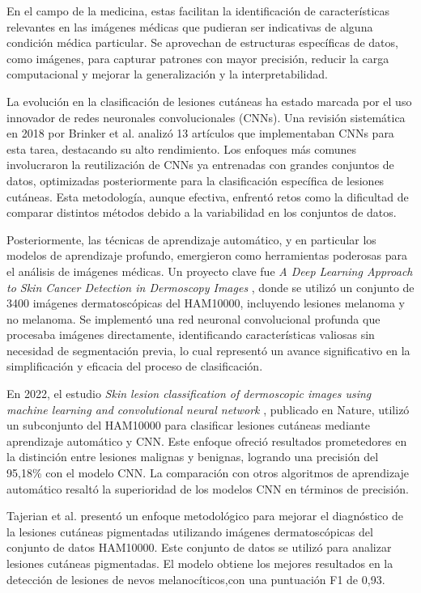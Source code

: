 En el campo de la medicina, estas facilitan la identificación de características relevantes en las imágenes médicas que pudieran ser indicativas de alguna condición médica particular. Se aprovechan de estructuras específicas de datos, como imágenes, para capturar patrones con mayor precisión, reducir la carga computacional y mejorar la generalización y la interpretabilidad. 

La evolución en la clasificación de lesiones cutáneas ha estado marcada por el uso innovador de redes neuronales convolucionales (CNNs). Una revisión sistemática en 2018 por Brinker et al.  analizó 13 artículos que implementaban CNNs para esta tarea, destacando su alto rendimiento. Los enfoques más comunes involucraron la reutilización de CNNs ya entrenadas con grandes conjuntos de datos, optimizadas posteriormente para la clasificación específica de lesiones cutáneas. Esta metodología, aunque efectiva, enfrentó retos como la dificultad de comparar distintos métodos debido a la variabilidad en los conjuntos de datos.

Posteriormente, las técnicas de aprendizaje automático, y en particular los modelos de aprendizaje profundo, emergieron como herramientas poderosas para el análisis de imágenes médicas. Un proyecto clave fue \textit{A Deep Learning Approach to Skin Cancer Detection in Dermoscopy Images} , donde se utilizó un conjunto de 3400 imágenes dermatoscópicas del HAM10000, incluyendo lesiones melanoma y no melanoma. Se implementó una red neuronal convolucional profunda que procesaba imágenes directamente, identificando características valiosas sin necesidad de segmentación previa, lo cual representó un avance significativo en la simplificación y eficacia del proceso de clasificación.

En 2022, el estudio \textit{Skin lesion classification of dermoscopic images using machine learning and convolutional neural network} , publicado en Nature, utilizó un subconjunto del HAM10000 para clasificar lesiones cutáneas mediante aprendizaje automático y CNN. Este enfoque ofreció resultados prometedores en la distinción entre lesiones malignas y benignas, logrando una precisión del 95,18\% con el modelo CNN. La comparación con otros algoritmos de aprendizaje automático resaltó la superioridad de los modelos CNN en términos de precisión.

Tajerian et al.  presentó un enfoque metodológico para mejorar el diagnóstico de la lesiones cutáneas pigmentadas utilizando imágenes dermatoscópicas del conjunto de datos HAM10000. Este conjunto de datos se utilizó para analizar lesiones cutáneas pigmentadas. El modelo obtiene los mejores resultados en la detección de lesiones de nevos melanocíticos,con una puntuación F1 de 0,93.


